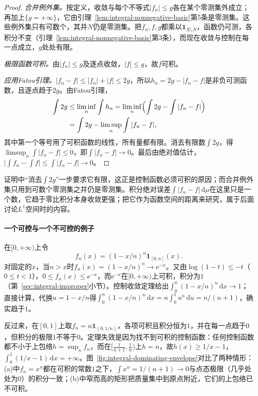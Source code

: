 \begin{proof}
\emph{合并例外集。}按定义，收敛与每个不等式$|f_n|\le g$各在某个零测集外成立；再加上$\{g=+\infty\}$，它由引理~\ref{lem:integral-nonnegative-basic}第5条是零测集。这些例外集只有可数个，其并$N$仍是零测集。把$f_n,f,g$都乘以$\mathbf 1_{X\setminus N}$，函数仍可测，各积分不变（引理~\ref{lem:integral-nonnegative-basic}第3条），而现在收敛与控制在每一点成立，$g$处处有限。

\emph{极限函数可积。}由$|f_n|\le g$及逐点收敛，$|f|\le g$，故$f$可积。

\emph{应用Fatou引理。}$|f_n-f|\le|f_n|+|f|\le2g$，所以$h_n=2g-|f_n-f|$是非负可测函数，且逐点趋于$2g$。由Fatou引理，
\[
 \begin{aligned}
  \int2g&\le\liminf_n\int h_n=\liminf_n\Bigl(\int2g-\int|f_n-f|\Bigr)\\
  &=\int2g-\limsup_n\int|f_n-f|,
 \end{aligned}
\]
其中第一个等号用了可积函数的线性，所有量都有限。消去有限数$\int2g$，得$\limsup_n\int|f_n-f|\le0$，即$\int|f_n-f|\to0$。最后由绝对值估计，$\bigl|\int f_n-\int f\bigr|\le\int|f_n-f|\to0$。
\end{proof}

证明中“消去$\int2g$”一步要求它有限，这正是控制函数必须可积的原因；而合并例外集只用到可数个零测集之并仍是零测集。积分绝对误差$\int|f_n-f|\,\mathrm d\mu$在这里只是一个数，它趋于零比积分本身收敛更强；把它作为函数空间的距离来研究，属于后面讨论$L^1$空间时的内容。

\paragraph{一个可控与一个不可控的例子}
在$[0,+\infty)$上令
\[
 f_n(x)=(1-x/n)^n\mathbf 1_{[0,n]}(x).
\]
对固定的$x$，当$n>x$时$f_n(x)=(1-x/n)^n\to\mathrm e^{-x}$。又由$\log(1-t)\le-t$（$0\le t<1$），$0\le f_n(x)\le\mathrm e^{-x}$，而$\mathrm e^{-x}$在$[0,+\infty)$上可积，积分为$1$（第~\ref{sec:integral-improper}小节）。控制收敛定理给出$\int_0^n(1-x/n)^n\,\mathrm dx\to1$；直接计算，代换$u=1-x/n$得$\int_0^n(1-x/n)^n\,\mathrm dx=n\int_0^1u^n\,\mathrm du=n/(n+1)$，确实趋于$1$。

反过来，在$[0,1]$上取$f_n=n\mathbf 1_{(0,1/n)}$，各项可积且积分恒为$1$，并在每一点趋于$0$，但积分的极限$1$不等于$0$。定理失效是因为找不到可积的控制函数：任何控制函数都不小于上包络$h=\sup_nf_n$，而在$[\frac1{n+1},\frac1n)$上$h=n$，故$h(x)\ge1/x-1$，$\int_0^1(1/x-1)\,\mathrm dx=+\infty$。图~\ref{fig:integral-dominating-envelope}对比了两种情形：(a)中$f_n=x^n$都在可积的常数$1$之下，$\int x^n=1/(n+1)\to0$与点态极限（几乎处处为$0$）的积分一致；(b)中窄而高的矩形把质量集中到原点附近，它们的上包络已不可积。

